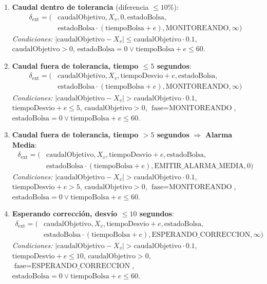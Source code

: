 \documentclass[12pt,a4paper,oneside]{report}
\begin{document}
\begin{enumerate}
    \item \textbf{Caudal dentro de tolerancia} (diferencia $\leq 10\%$):
    \[
    \begin{aligned}
    \delta_{\text{ext}} = (&\text{caudalObjetivo}, X_v, 0, \text{estadoBolsa}, \\
    &\text{estadoBolsa} \cdot (\text{tiempoBolsa} + e), \text{MONITOREANDO}, \infty)
    \end{aligned}
    \]
    \textit{Condiciones:} $|\text{caudalObjetivo} - X_v| \leq \text{caudalObjetivo} \cdot 0.1$, $\text{caudalObjetivo} > 0$, $\text{estadoBolsa} = 0 \vee \text{tiempoBolsa} + e \leq 60$.
    
    \item \textbf{Caudal fuera de tolerancia, tiempo $\leq 5$ segundos}:
    \[
    \begin{aligned}
    \delta_{\text{ext}} = (&\text{caudalObjetivo}, X_v, \text{tiempoDesvio} + e, \text{estadoBolsa}, \\
    &\text{estadoBolsa} \cdot (\text{tiempoBolsa} + e), \text{MONITOREANDO}, \infty)
    \end{aligned}
    \]
    \textit{Condiciones:} $|\text{caudalObjetivo} - X_v| > \text{caudalObjetivo} \cdot 0.1$, $\text{tiempoDesvio} + e \leq 5$, $\text{caudalObjetivo} > 0$, $\text{fase} = \text{MONITOREANDO}$, $\text{estadoBolsa} = 0 \vee \text{tiempoBolsa} + e \leq 60$.
    
    \item \textbf{Caudal fuera de tolerancia, tiempo $> 5$ segundos} $\Rightarrow$ \textbf{Alarma Media}:
    \[
    \begin{aligned}
    \delta_{\text{ext}} = (&\text{caudalObjetivo}, X_v, \text{tiempoDesvio} + e, \text{estadoBolsa}, \\
    &\text{estadoBolsa} \cdot (\text{tiempoBolsa} + e), \text{EMITIR\_ALARMA\_MEDIA}, 0)
    \end{aligned}
    \]
    \textit{Condiciones:} $|\text{caudalObjetivo} - X_v| > \text{caudalObjetivo} \cdot 0.1$, $\text{tiempoDesvio} + e > 5$, $\text{caudalObjetivo} > 0$, $\text{fase} = \text{MONITOREANDO}$, $\text{estadoBolsa} = 0 \vee \text{tiempoBolsa} + e \leq 60$.
    
    \item \textbf{Esperando corrección, desvío $\leq 10$ segundos}:
    \[
    \begin{aligned}
    \delta_{\text{ext}} = (&\text{caudalObjetivo}, X_v, \text{tiempoDesvio} + e, \text{estadoBolsa}, \\
    &\text{estadoBolsa} \cdot (\text{tiempoBolsa} + e), \text{ESPERANDO\_CORRECCION}, \infty)
    \end{aligned}
    \]
    \textit{Condiciones:} $|\text{caudalObjetivo} - X_v| > \text{caudalObjetivo} \cdot 0.1$, $\text{tiempoDesvio} + e \leq 10$, $\text{caudalObjetivo} > 0$, $\text{fase} = \text{ESPERANDO\_CORRECCION}$, $\text{estadoBolsa} = 0 \vee \text{tiempoBolsa} + e \leq 60$.
    

\end{enumerate}
\end{document}
